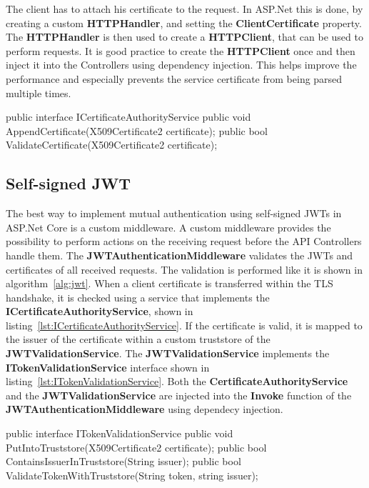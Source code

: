 The client has to attach his certificate to the request.
In ASP.Net this is done, by creating a custom \textbf{HTTPHandler}, and setting the \textbf{ClientCertificate} property.
The \textbf{HTTPHandler} is then used to create a \textbf{HTTPClient}, that can be used to perform requests.
It is good practice to create the \textbf{HTTPClient} once and then inject it into the Controllers using dependency injection.
This helps improve the performance and especially prevents the service certificate from being parsed multiple times.

\noindent \begin{minipage}{\linewidth}
	\begin{CsCode}[label={lst:ICertificateAuthorityService}, caption={ICertificateAuthorityService interface that is, implemented by the injected CertificateAuthorityService},captionpos=b]
		public interface ICertificateAuthorityService {
			public void AppendCertificate(X509Certificate2 certificate);
			public bool ValidateCertificate(X509Certificate2 certificate);
		}
	\end{CsCode}
\end{minipage}

\subsection{Self-signed JWT}
The best way to implement mutual authentication using self-signed JWTs in ASP.Net Core is a custom middleware.
A custom middleware provides the possibility to perform actions on the receiving request before the API Controllers handle them.
The \textbf{JWTAuthenticationMiddleware} validates the JWTs and certificates of all received requests.
The validation is performed like it is shown in algorithm~\ref{alg:jwt}.
When a client certificate is transferred within the TLS handshake, it is checked using a service that implements the \textbf{ICertificateAuthorityService}, shown in listing~\ref{lst:ICertificateAuthorityService}.
If the certificate is valid, it is mapped to the issuer of the certificate within a custom truststore of the \textbf{JWTValidationService}.
The \textbf{JWTValidationService} implements the \textbf{ITokenValidationService} interface shown in listing~\ref{lst:ITokenValidationService}.
Both the \textbf{CertificateAuthorityService} and the \textbf{JWTValidationService} are injected into the \textbf{Invoke} function of the \textbf{JWTAuthenticationMiddleware} using dependecy injection.

\noindent \begin{minipage}{\linewidth}
	\begin{CsCode}[label={lst:ITokenValidationService}, caption={ITokenValidationService interface, that is implemented by the injected JWTValidationService},captionpos=b]
		public interface ITokenValidationService {
			public void PutIntoTruststore(X509Certificate2 certificate);
			public bool ContainsIssuerInTruststore(String issuer);
			public bool ValidateTokenWithTruststore(String token, string issuer);
		}
	\end{CsCode}
\end{minipage}

